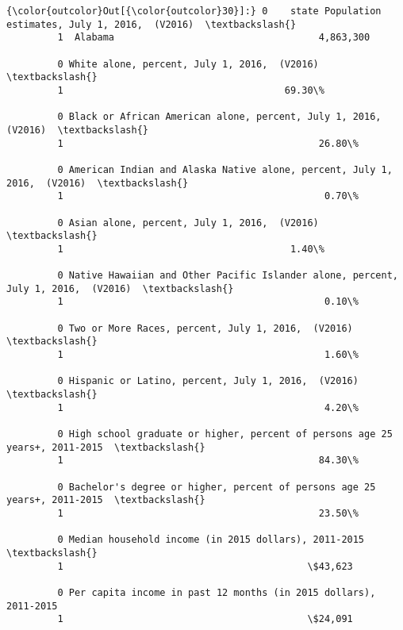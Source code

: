 \documentclass[11pt]{article}
\begin{document}
\begin{Verbatim}[commandchars=\\\{\}]
{\color{outcolor}Out[{\color{outcolor}30}]:} 0    state Population estimates, July 1, 2016,  (V2016)  \textbackslash{}
         1  Alabama                                    4,863,300   
         
         0 White alone, percent, July 1, 2016,  (V2016)  \textbackslash{}
         1                                       69.30\%   
         
         0 Black or African American alone, percent, July 1, 2016,  (V2016)  \textbackslash{}
         1                                             26.80\%                 
         
         0 American Indian and Alaska Native alone, percent, July 1, 2016,  (V2016)  \textbackslash{}
         1                                              0.70\%                         
         
         0 Asian alone, percent, July 1, 2016,  (V2016)  \textbackslash{}
         1                                        1.40\%   
         
         0 Native Hawaiian and Other Pacific Islander alone, percent, July 1, 2016,  (V2016)  \textbackslash{}
         1                                              0.10\%                                  
         
         0 Two or More Races, percent, July 1, 2016,  (V2016)  \textbackslash{}
         1                                              1.60\%   
         
         0 Hispanic or Latino, percent, July 1, 2016,  (V2016)  \textbackslash{}
         1                                              4.20\%    
         
         0 High school graduate or higher, percent of persons age 25 years+, 2011-2015  \textbackslash{}
         1                                             84.30\%                            
         
         0 Bachelor's degree or higher, percent of persons age 25 years+, 2011-2015  \textbackslash{}
         1                                             23.50\%                         
         
         0 Median household income (in 2015 dollars), 2011-2015  \textbackslash{}
         1                                           \$43,623      
         
         0 Per capita income in past 12 months (in 2015 dollars), 2011-2015  
         1                                           \$24,091                 
\end{Verbatim}
            
\end{document}
